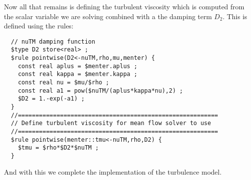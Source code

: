 \documentclass[letterpaper,twoside]{article}
\begin{document}
Now all that remains is defining the turbulent viscosity which is
computed from the scalar variable we are solving combined with a
the damping term $D_2$.  This is defined using the rules:
\begin{verbatim}
  // nuTM damping function
  $type D2 store<real> ;
  $rule pointwise(D2<-nuTM,rho,mu,menter) {
    const real aplus = $menter.aplus ;
    const real kappa = $menter.kappa ;
    const real nu = $mu/$rho ;
    const real a1 = pow($nuTM/(aplus*kappa*nu),2) ;
    $D2 = 1.-exp(-a1) ;
  }
  //=========================================================
  // Define turbulent viscosity for mean flow solver to use
  //=========================================================
  $rule pointwise(menter::tmu<-nuTM,rho,D2) {
    $tmu = $rho*$D2*$nuTM ;
  }
\end{verbatim}

And with this we complete the implementation of the turbulence model.



\end{document}
